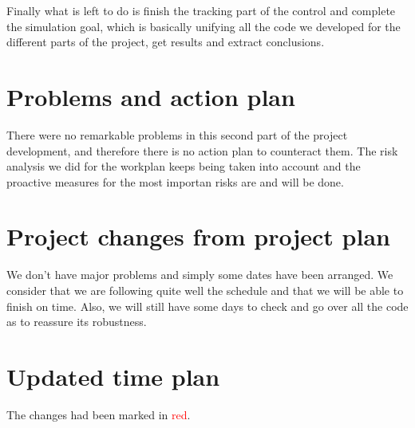 \documentclass{article}
\begin{document}
Finally what is left to do is finish the tracking part of the control and complete the simulation goal, which is basically unifying all the code we developed for the different parts of the project, get results and extract conclusions. 


\section{Problems and action plan}

There were no remarkable problems in this second part of the project development, and therefore there is no action plan to counteract them. The risk analysis we did for the workplan keeps being taken into account and the proactive measures for the most importan risks are and will be done.

\section{Project changes from project plan}
We don't have major problems and simply some dates have been arranged. We consider that we are following quite well the schedule and that we will be able to finish on time.  Also, we will still have some days to check and go over all the code as to reassure its robustness.

\newpage
\appendix
\section{Updated time plan}

The changes had been marked in \textcolor{red}{red}. \\
\end{document}
